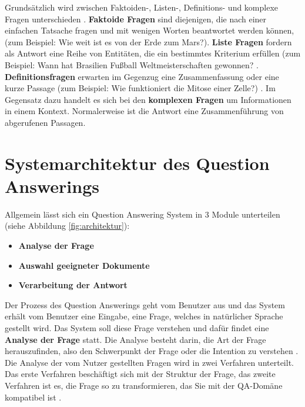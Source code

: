 \documentclass[
        ngerman,
        paper=a4,
        numbers=noendperiod,
]{scrreprt}
\begin{document}
Grundsätzlich wird zwischen Faktoiden-, Listen-, Definitions- und komplexe Fragen unterschieden \citep{Kolomiyets2011APerspective}. \textbf{Faktoide Fragen} sind diejenigen, die nach einer einfachen Tatsache fragen und mit wenigen Worten beantwortet werden können, (zum Beispiel: Wie weit ist es von der Erde zum Mars?). \textbf{Liste Fragen} fordern als Antwort eine Reihe von Entitäten, die ein bestimmtes Kriterium erfüllen (zum Beispiel: Wann hat Brasilien Fußball Weltmeisterschaften gewonnen? \citep{Heie2012QuestionModelling}. \textbf{Definitionsfragen} erwarten im Gegenzug eine Zusammenfassung oder eine kurze Passage (zum Beispiel: Wie funktioniert die Mitose einer Zelle?) \citep{Neves2015QuestionBiology}. Im Gegensatz dazu handelt es sich bei den \textbf{komplexen Fragen} um Informationen in einem Kontext. Normalerweise ist die Antwort eine Zusammenführung von abgerufenen Passagen.


\section{Systemarchitektur des Question Answerings} %

%

Allgemein lässt sich ein Question Answering System in 3 Module unterteilen (siehe Abbildung \ref{fig:architektur}):
\begin{itemize}
    \item \textbf{Analyse der Frage}
    \item \textbf{Auswahl geeigneter Dokumente}
    \item \textbf{Verarbeitung der Antwort} 
\end{itemize}

Der Prozess des Question Answerings geht vom Benutzer aus und das System erhält vom Benutzer eine Eingabe, eine Frage, welches in natürlicher Sprache gestellt wird. Das System soll diese Frage verstehen und dafür findet eine \textbf{Analyse der Frage} statt. Die Analyse besteht darin, die Art der Frage herauszufinden, also den Schwerpunkt der Frage oder die Intention zu verstehen \citep{Malik2013DomainSystem}. Die Analyse der vom Nutzer gestellten Fragen wird in zwei Verfahren unterteilt. Das erste Verfahren beschäftigt sich mit der Struktur der Frage, das zweite Verfahren ist es, die Frage so zu transformieren, das Sie mit der QA-Domäne kompatibel ist \citep{Hamed2016AClassification}.
\end{document}
